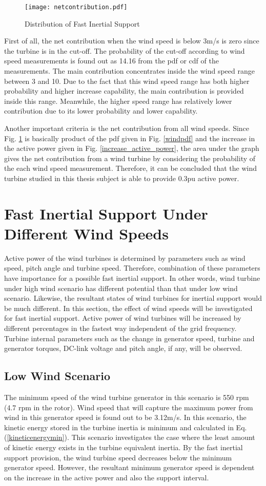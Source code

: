 \begin{figure}[h!]
	\centering
	\texttt{[image: netcontribution.pdf]}
	\caption{Distribution of Fast Inertial Support}
	\label{net_contribution}
\end{figure}
First of all, the net contribution when the wind speed is below 3m/s is zero since the turbine is in the cut-off. The probability of the cut-off according to wind speed measurements is found out as 14.16 from the pdf or cdf of the measurements. The main contribution concentrates inside the wind speed range between 3 and 10. Due to the fact that this wind speed range has both higher probability and higher increase capability, the main contribution is provided inside this range. Meanwhile, the higher speed range has relatively lower contribution due to its lower probability and lower capability. \par
Another important criteria is the net contribution from all wind speeds. Since Fig. \ref{net_contribution} is basically product of the pdf given in Fig. \ref{windpdf} and the increase in the active power given in Fig. \ref{increase_active_power}, the area under the graph gives the net contribution from a wind turbine by considering the probability of the each wind speed measurement. Therefore, it can be concluded that the wind turbine studied in this thesis subject is able to provide 0.3pu active power.
\section{Fast Inertial Support Under Different Wind Speeds}
Active power of the wind turbines is determined by parameters such as wind speed, pitch angle and turbine speed. Therefore, combination of these parameters have importance for a possible fast inertial support. In other words, wind turbine under high wind scenario has different potential than that under low wind scenario. Likewise, the resultant states of wind turbines for inertial support would be much different. In this section, the effect of wind speeds will be investigated for fast inertial support. Active power of wind turbines will be increased by different percentages in the fastest way independent of the grid frequency. Turbine internal parameters such as the change in generator speed, turbine and generator torques, DC-link voltage and pitch angle, if any, will be observed. 
\subsection{Low Wind Scenario}
\label{sec:lowwind}
The minimum speed of the wind turbine generator in this scenario is 550 rpm (4.7 rpm in the rotor). Wind speed that will capture the maximum power from wind in this generator speed is found out to be 3.12m/s. In this scenario, the kinetic energy stored in the turbine inertia is minimum and calculated in Eq. (\ref{kineticenergymin}). This scenario investigates the case where the least amount of kinetic energy exists in the turbine equivalent inertia. By the fast inertial support provision, the wind turbine speed decreases below the minimum generator speed. However, the resultant minimum generator speed is dependent on the increase in the active power and also the support interval.
